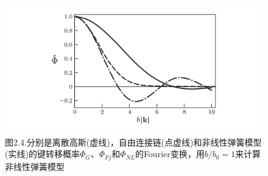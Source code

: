 \begin{figure}[ht]
\centering
\includegraphics[width=12cm]{./figures/24.png}
\caption{图2.4.分别是离散高斯(虚线)，自由连接链(点虚线)和非线性弹簧模型(实线)的键转移概率$\varPhi_{G}$、$\varPhi_{Fj}$和$\varPhi_{NL}$的Fourier变换，用$b/b_{0}=1$来计算非线性弹簧模型}
\end{figure}
